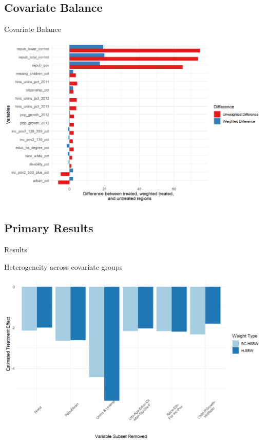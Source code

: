 \documentclass[hyperref={pdfpagelabels=false}]{beamer}
\begin{document}
\subsection{Covariate Balance}

\begin{frame}{Covariate Balance}
    \begin{center}
	\includegraphics[scale=0.5]{01_Plots/balance-plot-etu.png}
    \end{center}
\end{frame}

\subsection{Primary Results}

\begin{frame}{Results}

\end{frame}

\begin{frame}{Heterogeneity across covariate groups}
\begin{center}
	\includegraphics[scale=0.5]{01_Plots/loo-covariates-main-c1.png}
\end{center}
\end{frame}
\end{document}
